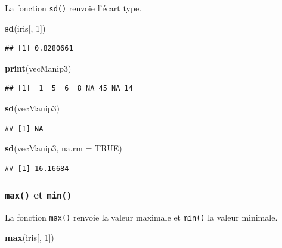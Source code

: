 \documentclass[]{book}
\newenvironment{Shaded}{\begin{snugshade}}{\end{snugshade}}
\newcommand{\DataTypeTok}[1]{\textcolor[rgb]{0.13,0.29,0.53}{#1}}
\newcommand{\DecValTok}[1]{\textcolor[rgb]{0.00,0.00,0.81}{#1}}
\newcommand{\KeywordTok}[1]{\textcolor[rgb]{0.13,0.29,0.53}{\textbf{#1}}}
\newcommand{\NormalTok}[1]{#1}
\newcommand{\OtherTok}[1]{\textcolor[rgb]{0.56,0.35,0.01}{#1}}
\begin{document}
La fonction \texttt{sd()} renvoie l'écart type.

\begin{Shaded}
\begin{Highlighting}[]
\KeywordTok{sd}\NormalTok{(iris[, }\DecValTok{1}\NormalTok{])}
\end{Highlighting}
\end{Shaded}

\begin{verbatim}
## [1] 0.8280661
\end{verbatim}

\begin{Shaded}
\begin{Highlighting}[]
\KeywordTok{print}\NormalTok{(vecManip3)}
\end{Highlighting}
\end{Shaded}

\begin{verbatim}
## [1]  1  5  6  8 NA 45 NA 14
\end{verbatim}

\begin{Shaded}
\begin{Highlighting}[]
\KeywordTok{sd}\NormalTok{(vecManip3)}
\end{Highlighting}
\end{Shaded}

\begin{verbatim}
## [1] NA
\end{verbatim}

\begin{Shaded}
\begin{Highlighting}[]
\KeywordTok{sd}\NormalTok{(vecManip3, }\DataTypeTok{na.rm =} \OtherTok{TRUE}\NormalTok{)}
\end{Highlighting}
\end{Shaded}

\begin{verbatim}
## [1] 16.16684
\end{verbatim}

\hypertarget{l015max}{%
\subsubsection{\texorpdfstring{\texttt{max()} et \texttt{min()}}{max() et min()}}\label{l015max}}

La fonction \texttt{max()} renvoie la valeur maximale et \texttt{min()} la valeur minimale.

\begin{Shaded}
\begin{Highlighting}[]
\KeywordTok{max}\NormalTok{(iris[, }\DecValTok{1}\NormalTok{])}
\end{Highlighting}
\end{Shaded}
\end{document}
